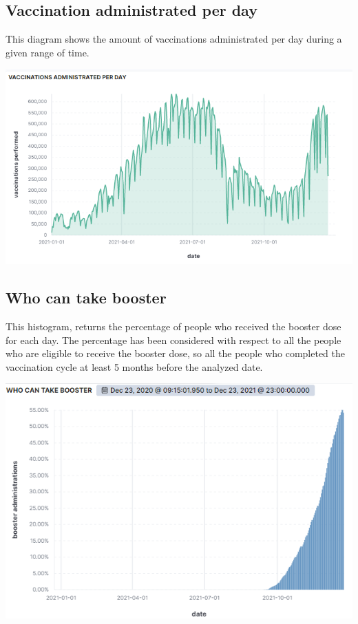 \documentclass{article}
\begin{document}
\subsection{Vaccination administrated per day}
This diagram shows the amount of vaccinations administrated per day during a given range of time.

\begin{center}
\includegraphics[scale=0.6]{vacc_adm_per_day.png}
\end{center}

\subsection{Who can take booster}
This histogram, returns the percentage of people who received the booster dose for each day. The percentage has been considered with respect to all the people who are eligible to receive the booster dose, so all the people who completed the vaccination cycle at least 5 months before the analyzed date.

\begin{center}
\includegraphics[scale=0.6]{who_booster.png}
\end{center}
\end{document}
